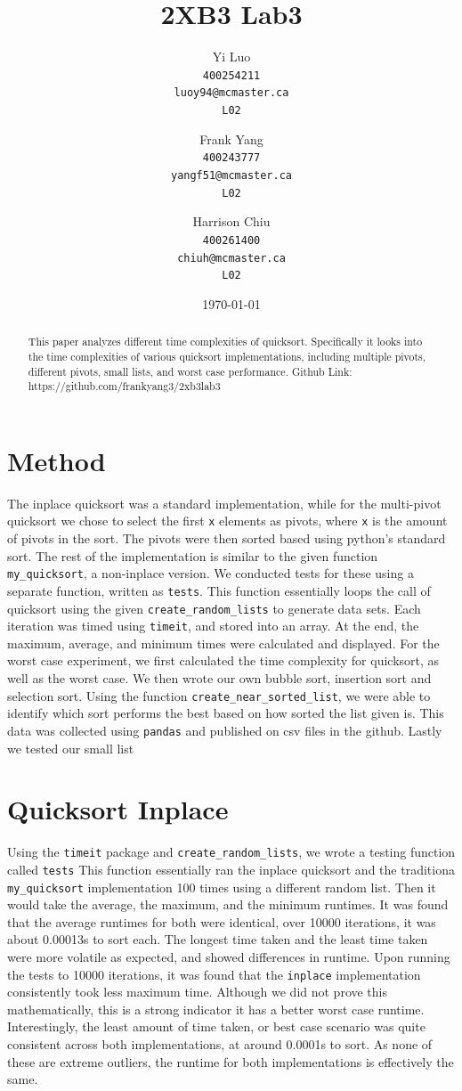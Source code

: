 \documentclass{article}
\title{2XB3 Lab3}
\author{
  Yi Luo\\
  \texttt{400254211}\\
  \texttt{luoy94@mcmaster.ca}\\
  \texttt{L02}
  \and
  Frank Yang\\
  \texttt{400243777}\\
  \texttt{yangf51@mcmaster.ca}\\
  \texttt{L02}
  \and
  Harrison Chiu\\
  \texttt{400261400}\\
  \texttt{chiuh@mcmaster.ca}\\
  \texttt{L02}
}
\date{\today}
\begin{document}
\maketitle

\begin{abstract}
This paper analyzes different time complexities of quicksort. Specifically it looks into the time complexities of various quicksort implementations, including multiple pivots, different pivots, small lists, and worst case performance. Github Link: https://github.com/frankyang3/2xb3lab3
\end{abstract}

\section*{Method}
 The inplace quicksort was a standard implementation, while for the multi-pivot quicksort we chose to select the first \verb|x| elements as pivots, where \verb|x| is the amount of pivots in the sort. The pivots were then sorted based using python's standard sort. The rest of the implementation is similar to the given function \verb|my_quicksort|, a non-inplace version. We conducted tests for these using a separate function, written as \verb|tests|. This function essentially loops the call of quicksort using the given \verb|create_random_lists| to generate data sets. Each iteration was timed using \verb|timeit|, and stored into an array. At the end, the maximum, average, and minimum times were calculated and displayed. For the worst case experiment, we first calculated the time complexity for quicksort, as well as the worst case. We then wrote our own bubble sort, insertion sort and selection sort. Using the function \verb|create_near_sorted_list|, we were able to identify which sort performs the best based on how sorted the list given is. This data was collected using \verb|pandas| and published on csv files in the github. Lastly we tested our small list



\section*{Quicksort Inplace}
Using the \verb|timeit| package and \verb|create_random_lists|, we wrote a testing function called \verb|tests| This function essentially ran the inplace quicksort and the traditiona \verb|my_quicksort| implementation 100 times using a different random list. Then it would take the average, the maximum, and the minimum runtimes. It was found that the average runtimes for both were identical, over 10000 iterations, it was about 0.00013s to sort each.
\break \break
The longest time taken and the least time taken were more volatile as expected, and showed differences in runtime. Upon running the tests to 10000 iterations, it was found that the \verb|inplace| implementation consistently took less maximum time. Although we did not prove this mathematically, this is a strong indicator it has a better worst case runtime. Interestingly, the least amount of time taken, or best case scenario was quite consistent across both implementations, at around 0.0001s to sort. As none of these are extreme outliers, the runtime for both implementations is effectively the same.
\end{document}
